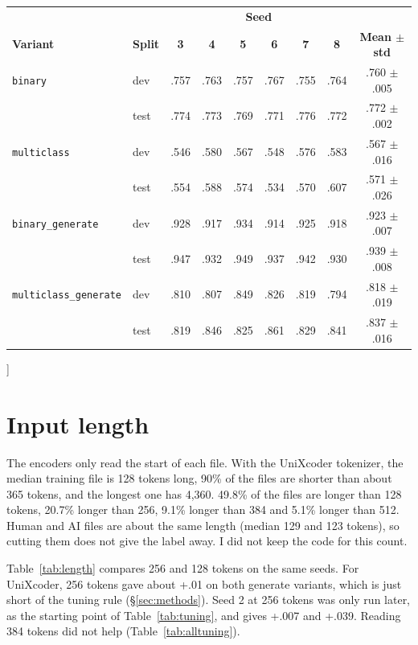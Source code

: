 \documentclass[11pt]{article}
\begin{document}
{\smallskip
{\centering
  \captionsetup{type=table}
  \small
  \begin{tabular}{llccccccc}
    \hline
    & & \multicolumn{6}{c}{\textbf{Seed}} & \\
    \textbf{Variant} & \textbf{Split} & \textbf{3} & \textbf{4} & \textbf{5} & \textbf{6} & \textbf{7} & \textbf{8} & \textbf{Mean $\pm$ std} \\
    \hline
    \texttt{binary}               & dev  & .757 & .763 & .757 & .767 & .755 & .764 & .760 $\pm$ .005 \\
    & test & .774 & .773 & .769 & .771 & .776 & .772 & .772 $\pm$ .002 \\
    \texttt{multiclass}           & dev  & .546 & .580 & .567 & .548 & .576 & .583 & .567 $\pm$ .016 \\
    & test & .554 & .588 & .574 & .534 & .570 & .607 & .571 $\pm$ .026 \\
    \texttt{binary\_generate}     & dev  & .928 & .917 & .934 & .914 & .925 & .918 & .923 $\pm$ .007 \\
    & test & .947 & .932 & .949 & .937 & .942 & .930 & .939 $\pm$ .008 \\
    \texttt{multiclass\_generate} & dev  & .810 & .807 & .849 & .826 & .819 & .794 & .818 $\pm$ .019 \\
    & test & .819 & .846 & .825 & .861 & .829 & .841 & .837 $\pm$ .016 \\
    \hline
  \end{tabular}
  \caption{Macro-F1 of the final UniXcoder runs, per seed. The test means are the single-seed column of Table~\ref{tab:test}.}
  \label{tab:seeds}
\par}
\medskip
}]

\section{Input length}
\label{app:length}

The encoders only read the start of each file. With the UniXcoder tokenizer, the median training file is 128 tokens long, 90\% of the files are shorter than about 365 tokens, and the longest one has 4,360. 49.8\% of the files are longer than 128 tokens, 20.7\% longer than 256, 9.1\% longer than 384 and 5.1\% longer than 512. Human and AI files are about the same length (median 129 and 123 tokens), so cutting them does not give the label away. I did not keep the code for this count.

Table~\ref{tab:length} compares 256 and 128 tokens on the same seeds. For UniXcoder, 256 tokens gave about +.01 on both generate variants, which is just short of the tuning rule (\S\ref{sec:methods}). Seed 2 at 256 tokens was only run later, as the starting point of Table~\ref{tab:tuning}, and gives +.007 and +.039. Reading 384 tokens did not help (Table~\ref{tab:alltuning}).
\end{document}
